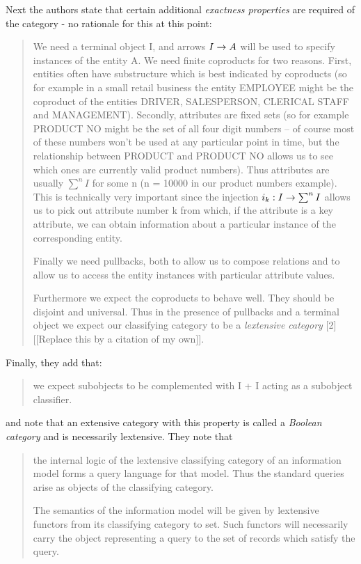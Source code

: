 \documentclass[10pt,a4paper]{scrartcl}
\begin{document}
Next the authors state that certain additional \textit{exactness properties} are required of the category
- no rationale for this at this point:
\begin{quote}
We need a terminal object I, 
and arrows $I \rightarrow A$ will be used to specify instances of the entity A. We
need finite coproducts for two reasons. First, entities often have substructure
which is best indicated by coproducts (so for example in a small retail 
business the entity EMPLOYEE might be the coproduct of the entities DRIVER,
SALESPERSON, CLERICAL STAFF and MANAGEMENT). Secondly, attributes
are fixed sets (so for example PRODUCT NO might be the set of all four digit
numbers -- of course most of these numbers won't be used at any particular point
in time, but the relationship between PRODUCT and PRODUCT NO allows us
to see which ones are currently valid product numbers). Thus attributes are
usually $\sum^nI $ for some n (n = 10000 in our product numbers example). This
is technically very important since the injection $i_k:I \rightarrow \sum^nI$  allows us to
pick out attribute number k from which, if the attribute is a key attribute, we
can obtain information about a particular instance of the corresponding entity.

Finally we need pullbacks, both to allow us to compose relations and to allow
us to access the entity instances with particular attribute values.

Furthermore we expect the coproducts to behave well. They should be
disjoint and universal. Thus in the presence of pullbacks and a 
terminal object
we expect our classifying category to be a \textit{lextensive category} [2] [[Replace this by a citation of my own]].
\end{quote}
Finally, they add that:
\begin{quote}
we expect subobjects to be complemented with I + I acting as
a subobject classifier. 
\end{quote}
and note that an extensive category with this property is called a
\textit{Boolean category} and is necessarily lextensive. 
They note that
\begin{quote}
 the internal logic of the lextensive
classifying category of an information model forms a query language for that
model. Thus the standard queries arise as objects of the classifying category.

The semantics of the information model will be given by lextensive functors
from its classifying category to set. Such functors will necessarily carry the
object representing a query to the set of records which satisfy the query.
\end{quote}
\end{document}
